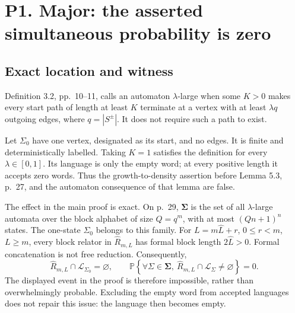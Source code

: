 \documentclass[10pt]{article}
\begin{document}
\section*{P1. Major: the asserted simultaneous probability is zero}
\subsection*{Exact location and witness}
Definition 3.2, pp. 10–11, calls an automaton \(\lambda\)-large when some \(K>0\) makes every start path of length at least \(K\) terminate at a vertex with at least \(\lambda q\) outgoing edges, where \(q=|S^\pm|\). It does not require such a path to exist.\par
Let \(\Sigma_0\) have one vertex, designated as its start, and no edges. It is finite and deterministically labelled. Taking \(K=1\) satisfies the definition for every \(\lambda\in[0,1]\). Its language is only the empty word; at every positive length it accepts zero words. Thus the growth-to-density assertion before Lemma 5.3, p. 27, and the automaton consequence of that lemma are false.\par
The effect in the main proof is exact. On p. 29, \(\boldsymbol\Sigma\) is the set of all \(\lambda\)-large automata over the block alphabet of size \(Q=q^m\), with at most \((Qn+1)^n\) states. The one-state \(\Sigma_0\) belongs to this family. For \(L=m\widehat L+r\), \(0\le r<m\), \(L\ge m\), every block relator in \(\widehat R_{m,L}\) has formal block length \(2\widehat L>0\). Formal concatenation is not free reduction. Consequently, \[\widehat R_{m,L}\cap\mathcal L_{\Sigma_0}=\varnothing,
 \qquad
 \mathbb P\!\left\{\forall\Sigma\in\boldsymbol\Sigma,\
       \widehat R_{m,L}\cap\mathcal L_\Sigma\ne\varnothing\right\}=0.\] The displayed event in the proof is therefore impossible, rather than overwhelmingly probable. Excluding the empty word from accepted languages does not repair this issue: the language then becomes empty.\par
\end{document}

